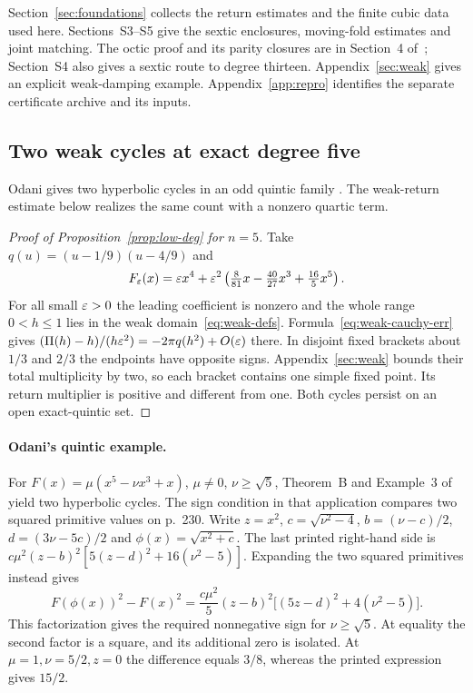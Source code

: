 \documentclass[11pt]{article}
\begin{document}
Section~\ref{sec:foundations} collects the return estimates and the
finite cubic data used here. Sections~S3--S5 give the sextic enclosures,
moving-fold estimates and joint matching. The octic proof and its parity closures are in
Section~4 of~\cite{MainArticle}; Section~S4 also gives a sextic route
to degree thirteen. Appendix~\ref{sec:weak} gives an explicit
weak-damping example. Appendix~\ref{app:repro} identifies the separate
certificate archive and its inputs.

\subsection{Two weak cycles at exact degree five}
Odani gives two hyperbolic cycles in an odd quintic family
\cite[Theorem~B and Example~3]{Odani1996}. The weak-return estimate
below realizes the same count with a nonzero quartic term.
\begin{proof}[Proof of Proposition~\ref{prop:low-deg} for $n=5$]
Take $q(u)=(u-1/9)(u-4/9)$ and
\[
 F_\varepsilon(x)=\varepsilon x^4+\varepsilon^2
 \left(\tfrac{8}{81}x-\tfrac{40}{27}x^3+\tfrac{16}{5}x^5\right).
\]
For all small $\varepsilon>0$ the leading coefficient is nonzero and the whole range
$0<h\le1$ lies in the weak domain~\eqref{eq:weak-defs}. Formula~\eqref{eq:weak-cauchy-err}
gives $(\Pi(h)-h)/(h\varepsilon^2)=-2\pi q(h^2)+O(\varepsilon)$ there. In disjoint
fixed brackets about $1/3$ and $2/3$ the endpoints have opposite signs.
Appendix~\ref{sec:weak} bounds their total multiplicity by two, so each
bracket contains one simple fixed point. Its return multiplier is positive
and different from one. Both cycles persist on an open exact-quintic set.
\end{proof}

\paragraph{Odani's quintic example.}
For $F(x)=\mu(x^5-\nu x^3+x)$, $\mu\ne0$, $\nu\ge\sqrt5$, Theorem~B
and Example~3 of~\cite[pp.~217--218, 230]{Odani1996} yield two
hyperbolic cycles. The sign condition in that application compares two squared primitive values on p.~230. Write $z=x^2$,
$c=\sqrt{\nu^2-4}$, $b=(\nu-c)/2$, $d=(3\nu-5c)/2$ and
$\phi(x)=\sqrt{x^2+c}$. The last printed right-hand side is
$c\mu^2(z-b)^2[5(z-d)^2+16(\nu^2-5)]$.
Expanding the two squared primitives instead gives
\[
 F(\phi(x))^2-F(x)^2
 =\frac{c\mu^2}{5}(z-b)^2\big[(5z-d)^2+4(\nu^2-5)\big].
\]
This factorization gives the required nonnegative sign for $\nu\ge\sqrt5$. At equality the
second factor is a square, and its additional zero is isolated.
At $\mu=1,\nu=5/2,z=0$ the difference equals $3/8$, whereas the printed
expression gives $15/2$.
\end{document}
